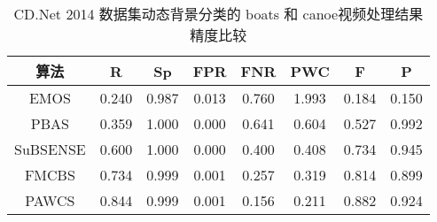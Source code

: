  \begin{table}[ht]
\caption{CD.Net 2014 数据集动态背景分类的 boats 和 canoe视频处理结果精度比较}
\label{ch4:tab:resultsDB}
\begin{center}
\begin{tabular}{cccccccc} %
\toprule[1.5pt]
\rule[-1ex]{0pt}{3.5ex}  算法 &R &Sp & FPR & FNR &PWC &F &P\\
\hline
\rule[-1ex]{0pt}{3.5ex}  EMOS\cite{Chien2002Efficient}&  0.240&0.987&0.013&0.760&1.993&0.184&0.150 \\

\rule[-1ex]{0pt}{3.5ex}  PBAS\cite{pbas}&0.359&1.000&0.000&0.641&0.604&0.527&0.992  \\

\rule[-1ex]{0pt}{3.5ex}  SuBSENSE\cite{subsenseTIP}&  0.600&1.000&0.000&0.400&0.408&0.734&0.945 \\

\rule[-1ex]{0pt}{3.5ex}  FMCBS &  0.734 & 0.999 & 0.001 & 0.257 &0.319&0.814&0.899\\

\rule[-1ex]{0pt}{3.5ex}  PAWCS\cite{Stcharles2015A}&0.844&0.999&0.001&0.156&0.211&0.882&0.924\\
\bottomrule[1.5pt]
\end{tabular}
\end{center}
\end{table}


